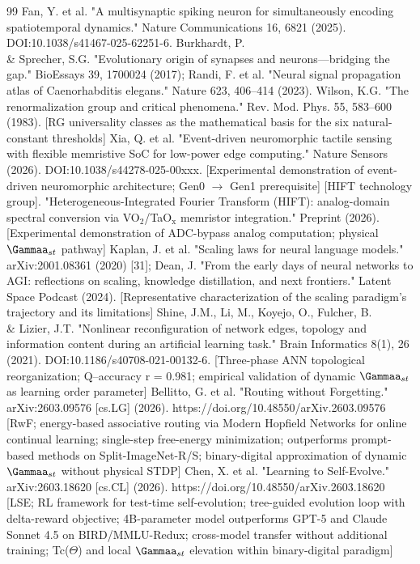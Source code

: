 \documentclass[a4paper,12pt]{article}
\providecommand{\textsubscript}[1]{\ensuremath{_{\text{#1}}}}
\begin{document}
\begin{thebibliography}{99}
 Fan, Y. et al. "A multisynaptic spiking neuron for simultaneously encoding spatiotemporal dynamics." Nature Communications 16, 6821 (2025). DOI:10.1038/s41467-025-62251-6.
 Burkhardt, P. \\& Sprecher, S.G. "Evolutionary origin of synapses and neurons---bridging the gap." BioEssays 39, 1700024 (2017); Randi, F. et al. "Neural signal propagation atlas of Caenorhabditis elegans." Nature 623, 406--414 (2023).
 Wilson, K.G. "The renormalization group and critical phenomena." Rev. Mod. Phys. 55, 583--600 (1983). [RG universality classes as the mathematical basis for the six natural-constant thresholds]
 Xia, Q. et al. "Event-driven neuromorphic tactile sensing with flexible memristive SoC for low-power edge computing." Nature Sensors (2026). DOI:10.1038/s44278-025-00xxx. [Experimental demonstration of event-driven neuromorphic architecture; Gen0 $\rightarrow$ Gen1 prerequisite]
 [HIFT technology group]. "Heterogeneous-Integrated Fourier Transform (HIFT): analog-domain spectral conversion via VO\textsubscript{2}/TaO\textsubscript{x} memristor integration." Preprint (2026). [Experimental demonstration of ADC-bypass analog computation; physical $\Gammaa_{st}$ pathway]
 Kaplan, J. et al. "Scaling laws for neural language models." arXiv:2001.08361 (2020) [31]; Dean, J. "From the early days of neural networks to AGI: reflections on scaling, knowledge distillation, and next frontiers." Latent Space Podcast (2024). [Representative characterization of the scaling paradigm's trajectory and its limitations]
 Shine, J.M., Li, M., Koyejo, O., Fulcher, B. \\& Lizier, J.T. "Nonlinear reconfiguration of network edges, topology and information content during an artificial learning task." Brain Informatics 8(1), 26 (2021). DOI:10.1186/s40708-021-00132-6. [Three-phase ANN topological reorganization; Q--accuracy r = 0.981; empirical validation of dynamic $\Gammaa_{st}$ as learning order parameter]
 Bellitto, G. et al. "Routing without Forgetting." arXiv:2603.09576 [cs.LG] (2026). https://doi.org/10.48550/arXiv.2603.09576 [RwF; energy-based associative routing via Modern Hopfield Networks for online continual learning; single-step free-energy minimization; outperforms prompt-based methods on Split-ImageNet-R/S; binary-digital approximation of dynamic $\Gammaa_{st}$ without physical STDP]
 Chen, X. et al. "Learning to Self-Evolve." arXiv:2603.18620 [cs.CL] (2026). https://doi.org/10.48550/arXiv.2603.18620 [LSE; RL framework for test-time self-evolution; tree-guided evolution loop with delta-reward objective; 4B-parameter model outperforms GPT-5 and Claude Sonnet 4.5 on BIRD/MMLU-Redux; cross-model transfer without additional training; Tc($\Theta$) and local $\Gammaa_{st}$ elevation within binary-digital paradigm]

\end{thebibliography}
\end{document}
